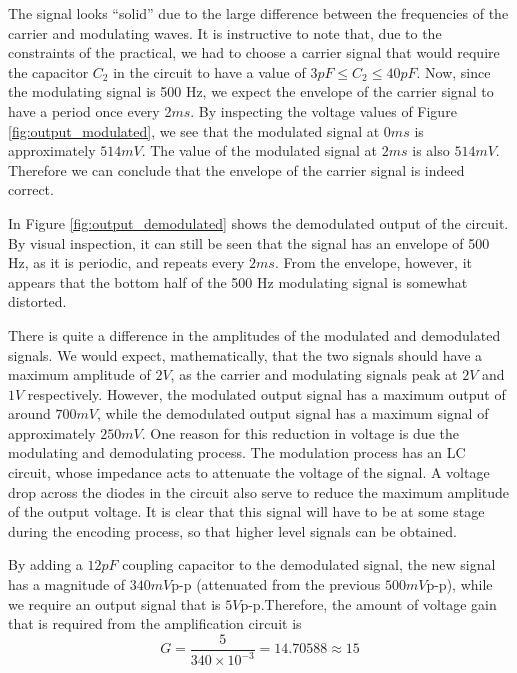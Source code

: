 \documentclass[12pt, a4paper]{article}
\begin{document}
	The signal looks ``solid'' due to the large difference between the frequencies of the carrier and modulating waves. It is instructive to note that, due to the constraints of the practical, we had to choose a carrier signal that would require the capacitor $C_2$ in the circuit to have a value of $3pF \le C_2 \le 40pF$. Now, since the modulating signal is 500 Hz, we expect the envelope of the carrier signal to have a period once every 2$ms$. By inspecting the voltage values of Figure \ref{fig:output_modulated}, we see that the modulated signal at 0$ms$ is approximately $514mV$. The value of the modulated signal at $2ms$ is also $514mV$. Therefore we can conclude that the envelope of the carrier signal is indeed correct.

	In Figure \ref{fig:output_demodulated} shows the demodulated output of the circuit. By visual inspection, it can still be seen that the signal has an envelope of 500 Hz, as it is periodic, and repeats every $2ms$. From the envelope, however, it appears that the bottom half of the 500 Hz modulating signal is somewhat distorted.\linebreak

	There is quite a difference in the amplitudes of the modulated and demodulated signals. We would expect, mathematically, that the two signals should have a maximum amplitude of $2V$, as the carrier and modulating signals peak at $2V$ and $1V$ respectively. However, the modulated output signal has a maximum output of around $700mV$, while the demodulated output signal has a maximum signal of approximately $250mV$. One reason for this reduction in voltage is due the modulating and demodulating process. The modulation process has an LC circuit, whose impedance acts to attenuate the voltage of the signal. A voltage drop across the diodes in the circuit also serve to reduce the maximum amplitude of the output voltage. It is clear that this signal will have to be at some stage during the encoding process, so that higher level signals can be obtained.

	By adding a $12pF$ coupling capacitor to the demodulated signal, the new signal has a magnitude of $340mV$p-p (attenuated from the previous $500mV$\mbox{p-p}), while we require an output signal that is $5V$p-p.Therefore, the amount of voltage gain that is required from the amplification circuit is
	\[
		G = \frac{5}{340\times 10^{-3}} = 14.70588 \approx 15
	\]
\end{document}
